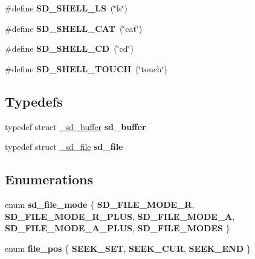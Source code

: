 \begin{DoxyCompactItemize}
\item 
\hypertarget{group__SD__Public_ga22406808e8ee8a624cdc5907460b3116}{\#define {\bfseries \-S\-D\-\_\-\-S\-H\-E\-L\-L\-\_\-\-L\-S}~(\char`\"{}ls\char`\"{})}\label{group__SD__Public_ga22406808e8ee8a624cdc5907460b3116}

\item 
\hypertarget{group__SD__Public_gadedf3ed15c6eae02a70d5d68ff99cece}{\#define {\bfseries \-S\-D\-\_\-\-S\-H\-E\-L\-L\-\_\-\-C\-A\-T}~(\char`\"{}cat\char`\"{})}\label{group__SD__Public_gadedf3ed15c6eae02a70d5d68ff99cece}

\item 
\hypertarget{group__SD__Public_ga6608a5ac2b0438ca1c0be83ee6673032}{\#define {\bfseries \-S\-D\-\_\-\-S\-H\-E\-L\-L\-\_\-\-C\-D}~(\char`\"{}cd\char`\"{})}\label{group__SD__Public_ga6608a5ac2b0438ca1c0be83ee6673032}

\item 
\hypertarget{group__SD__Public_gab9d5b49884f9f55508a7d581039a0026}{\#define {\bfseries \-S\-D\-\_\-\-S\-H\-E\-L\-L\-\_\-\-T\-O\-U\-C\-H}~(\char`\"{}touch\char`\"{})}\label{group__SD__Public_gab9d5b49884f9f55508a7d581039a0026}

\end{DoxyCompactItemize}
\subsection*{\-Typedefs}
\begin{DoxyCompactItemize}
\item 
\hypertarget{group__SD__Public_ga1c76037c62c46cef034ba7ba569120f1}{typedef struct \hyperlink{struct__sd__buffer}{\-\_\-sd\-\_\-buffer} {\bfseries sd\-\_\-buffer}}\label{group__SD__Public_ga1c76037c62c46cef034ba7ba569120f1}

\item 
\hypertarget{group__SD__Public_ga7c6b819d64f1bcac5c28ea3cf039abce}{typedef struct \hyperlink{struct__sd__file}{\-\_\-sd\-\_\-file} {\bfseries sd\-\_\-file}}\label{group__SD__Public_ga7c6b819d64f1bcac5c28ea3cf039abce}

\end{DoxyCompactItemize}
\subsection*{\-Enumerations}
\begin{DoxyCompactItemize}
\item 
enum {\bfseries sd\-\_\-file\-\_\-mode} \{ \*
{\bfseries \-S\-D\-\_\-\-F\-I\-L\-E\-\_\-\-M\-O\-D\-E\-\_\-\-R}, 
{\bfseries \-S\-D\-\_\-\-F\-I\-L\-E\-\_\-\-M\-O\-D\-E\-\_\-\-R\-\_\-\-P\-L\-U\-S}, 
{\bfseries \-S\-D\-\_\-\-F\-I\-L\-E\-\_\-\-M\-O\-D\-E\-\_\-\-A}, 
{\bfseries \-S\-D\-\_\-\-F\-I\-L\-E\-\_\-\-M\-O\-D\-E\-\_\-\-A\-\_\-\-P\-L\-U\-S}, 
\*
{\bfseries \-S\-D\-\_\-\-F\-I\-L\-E\-\_\-\-M\-O\-D\-E\-S}
 \}
\item 
enum {\bfseries file\-\_\-pos} \{ {\bfseries \-S\-E\-E\-K\-\_\-\-S\-E\-T}, 
{\bfseries \-S\-E\-E\-K\-\_\-\-C\-U\-R}, 
{\bfseries \-S\-E\-E\-K\-\_\-\-E\-N\-D}
 \}
\end{DoxyCompactItemize}
